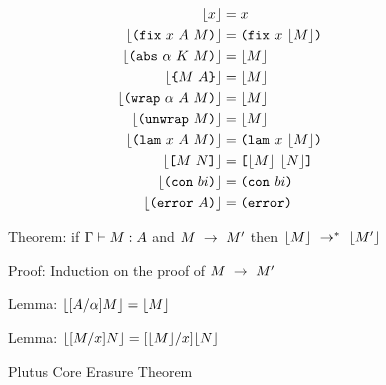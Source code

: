 \documentclass[../main.tex]{subfiles}
\begin{document}
\begin{figure*}
    \begin{align*}
        \erase{x} &= x\\
        \erase{\fix{x}{A}{M}} &= \fixE{x}{\erase{M}}\\
        \erase{\abs{\alpha}{K}{M}} &= \erase{M}\\
        \erase{\inst{M}{A}} &= \erase{M}\\
        \erase{\wrap{\alpha}{A}{M}} &= \erase{M}\\
        \erase{\unwrap{M}} &= \erase{M}\\
        \erase{\lam{x}{A}{M}} &= \lamE{x}{\erase{M}}\\
        \erase{\app{M}{N}} &= \appE{\erase{M}}{\erase{N}}\\
        \erase{\con{bi}} &= \conE{bi}\\
        \erase{\error{A}} &= \errorE    {}\\
    \end{align*}


    Theorem: if \(\hypJ{\Gamma}{\istermJ{M}{A}}\) and \(\step{M}{M'}\) then \(\multistep{\erase{M}}{\erase{M'}}\)
    
    Proof: Induction on the proof of \(\step{M}{M'}\)
    
    Lemma: \(\erase{\subst{A}{\alpha}{M}} = \erase{M}\)
    
    Lemma: \(\erase{\subst{M}{x}{N}} = \subst{\erase{M}}{x}{\erase{N}}\)

    \caption{Plutus Core Erasure Theorem}
    \label{fig:Plutus_core_erasure_theorem}
\end{figure*}          
\end{document}
